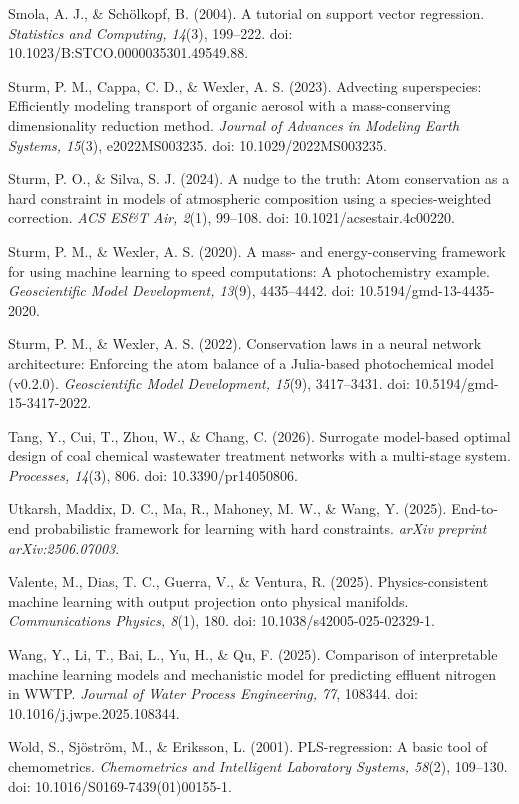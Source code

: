 \documentclass[a4paper,fleqn]{cas-sc}
\begin{document}
\noindent Smola, A. J., \& Sch\"olkopf, B. (2004). A tutorial on support vector regression. \textit{Statistics and Computing, 14}(3), 199--222. doi: 10.1023/B:STCO.0000035301.49549.88.

\noindent Sturm, P. M., Cappa, C. D., \& Wexler, A. S. (2023). Advecting superspecies: Efficiently modeling transport of organic aerosol with a mass-conserving dimensionality reduction method. \textit{Journal of Advances in Modeling Earth Systems, 15}(3), e2022MS003235. doi: 10.1029/2022MS003235.

\noindent Sturm, P. O., \& Silva, S. J. (2024). A nudge to the truth: Atom conservation as a hard constraint in models of atmospheric composition using a species-weighted correction. \textit{ACS ES\&T Air, 2}(1), 99--108. doi: 10.1021/acsestair.4c00220.

\noindent Sturm, P. M., \& Wexler, A. S. (2020). A mass- and energy-conserving framework for using machine learning to speed computations: A photochemistry example. \textit{Geoscientific Model Development, 13}(9), 4435--4442. doi: 10.5194/gmd-13-4435-2020.

\noindent Sturm, P. M., \& Wexler, A. S. (2022). Conservation laws in a neural network architecture: Enforcing the atom balance of a Julia-based photochemical model (v0.2.0). \textit{Geoscientific Model Development, 15}(9), 3417--3431. doi: 10.5194/gmd-15-3417-2022.

\noindent Tang, Y., Cui, T., Zhou, W., \& Chang, C. (2026). Surrogate model-based optimal design of coal chemical wastewater treatment networks with a multi-stage system. \textit{Processes, 14}(3), 806. doi: 10.3390/pr14050806.

\noindent Utkarsh, Maddix, D. C., Ma, R., Mahoney, M. W., \& Wang, Y. (2025). End-to-end probabilistic framework for learning with hard constraints. \textit{arXiv preprint arXiv:2506.07003}.

\noindent Valente, M., Dias, T. C., Guerra, V., \& Ventura, R. (2025). Physics-consistent machine learning with output projection onto physical manifolds. \textit{Communications Physics, 8}(1), 180. doi: 10.1038/s42005-025-02329-1.

\noindent Wang, Y., Li, T., Bai, L., Yu, H., \& Qu, F. (2025). Comparison of interpretable machine learning models and mechanistic model for predicting effluent nitrogen in WWTP. \textit{Journal of Water Process Engineering, 77}, 108344. doi: 10.1016/j.jwpe.2025.108344.

\noindent Wold, S., Sj\"ostr\"om, M., \& Eriksson, L. (2001). PLS-regression: A basic tool of chemometrics. \textit{Chemometrics and Intelligent Laboratory Systems, 58}(2), 109--130. doi: 10.1016/S0169-7439(01)00155-1.
\end{document}
